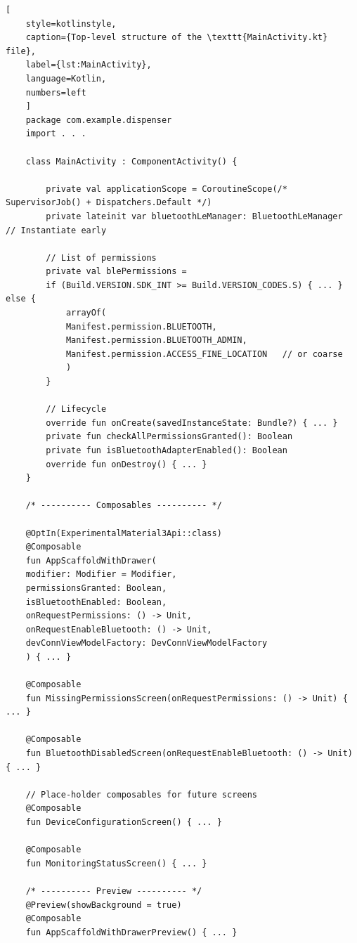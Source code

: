 \begin{lstlisting}[
	style=kotlinstyle,
	caption={Top-level structure of the \texttt{MainActivity.kt} file},
	label={lst:MainActivity},
	language=Kotlin,
	numbers=left
	]
	package com.example.dispenser
	import . . .
	
	class MainActivity : ComponentActivity() {
		
		private val applicationScope = CoroutineScope(/* SupervisorJob() + Dispatchers.Default */)
		private lateinit var bluetoothLeManager: BluetoothLeManager   // Instantiate early
		
		// List of permissions
		private val blePermissions =
		if (Build.VERSION.SDK_INT >= Build.VERSION_CODES.S) { ... } else {
			arrayOf(
			Manifest.permission.BLUETOOTH,
			Manifest.permission.BLUETOOTH_ADMIN,
			Manifest.permission.ACCESS_FINE_LOCATION   // or coarse
			)
		}
		
		// Lifecycle
		override fun onCreate(savedInstanceState: Bundle?) { ... }
		private fun checkAllPermissionsGranted(): Boolean
		private fun isBluetoothAdapterEnabled(): Boolean
		override fun onDestroy() { ... }
	}
	
	/* ---------- Composables ---------- */
	
	@OptIn(ExperimentalMaterial3Api::class)
	@Composable
	fun AppScaffoldWithDrawer(
	modifier: Modifier = Modifier,
	permissionsGranted: Boolean,
	isBluetoothEnabled: Boolean,
	onRequestPermissions: () -> Unit,
	onRequestEnableBluetooth: () -> Unit,
	devConnViewModelFactory: DevConnViewModelFactory
	) { ... }
	
	@Composable
	fun MissingPermissionsScreen(onRequestPermissions: () -> Unit) { ... }
	
	@Composable
	fun BluetoothDisabledScreen(onRequestEnableBluetooth: () -> Unit) { ... }
	
	// Place-holder composables for future screens
	@Composable
	fun DeviceConfigurationScreen() { ... }
	
	@Composable
	fun MonitoringStatusScreen() { ... }
	
	/* ---------- Preview ---------- */
	@Preview(showBackground = true)
	@Composable
	fun AppScaffoldWithDrawerPreview() { ... }
\end{lstlisting}

